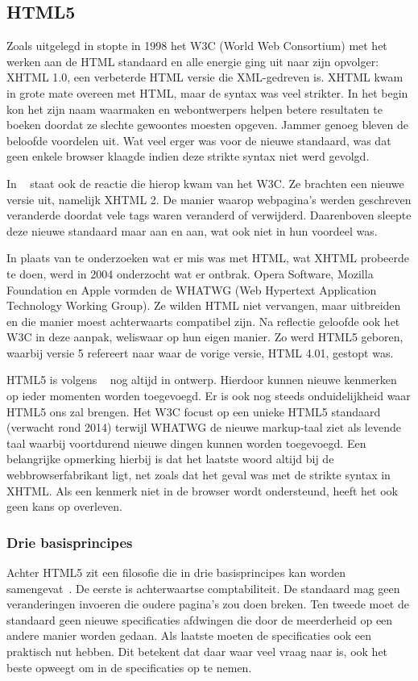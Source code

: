 \subsection{HTML5}
Zoals uitgelegd in \cite{MacDonald2011} stopte in 1998 het W3C (World Web Consortium) met het werken aan de HTML standaard en alle energie ging uit naar zijn opvolger: XHTML 1.0, een verbeterde HTML versie die XML-gedreven is. 
XHTML kwam in grote mate overeen met HTML, maar de syntax was veel strikter. 
In het begin kon het zijn naam waarmaken en webontwerpers helpen betere resultaten te boeken doordat ze slechte gewoontes moesten opgeven. 
Jammer genoeg bleven de beloofde voordelen uit. 
Wat veel erger was voor de nieuwe standaard, was dat geen enkele browser klaagde indien deze strikte syntax niet werd gevolgd.

In ~\cite{MacDonald2011} staat ook de reactie die hierop kwam van het W3C.  
Ze brachten een nieuwe versie uit, namelijk XHTML 2.
De manier waarop webpagina's werden geschreven veranderde doordat vele tags waren veranderd of verwijderd. 
Daarenboven sleepte deze nieuwe standaard maar aan en aan, wat ook niet in hun voordeel was. 

In plaats van te onderzoeken wat er mis was met HTML, wat XHTML probeerde te doen, werd in 2004 onderzocht wat er ontbrak. 
Opera Software, Mozilla Foundation en Apple vormden de WHATWG (Web Hypertext Application Technology Working Group). 
Ze wilden HTML niet vervangen, maar uitbreiden en die manier moest achterwaarts compatibel zijn. Na reflectie geloofde ook het W3C in deze aanpak, weliswaar op hun eigen manier.  
Zo werd HTML5 geboren, waarbij versie 5 refereert naar waar de vorige versie, HTML 4.01, gestopt was.

HTML5 is volgens ~\cite{MacDonald2011} nog altijd in ontwerp. 
Hierdoor kunnen nieuwe kenmerken op ieder momenten worden toegevoegd.  
Er is ook nog steeds onduidelijkheid waar HTML5 ons zal brengen.  
Het W3C focust op een unieke HTML5 standaard (verwacht rond 2014) terwijl WHATWG de nieuwe markup-taal ziet als levende taal waarbij voortdurend  nieuwe dingen kunnen worden toegevoegd. 
Een belangrijke opmerking hierbij is dat het laatste woord altijd bij de webbrowserfabrikant ligt, net zoals dat het geval was met de strikte syntax in XHTML. 
Als een kenmerk niet in de browser wordt ondersteund, heeft het ook geen kans op overleven.

\subsubsection{Drie basisprincipes}
Achter HTML5 zit een filosofie die in drie basisprincipes kan worden samengevat~\cite{MacDonald2011}.  
De eerste is achterwaartse comptabiliteit. De standaard mag geen veranderingen invoeren die oudere pagina's zou doen breken. 
Ten tweede moet de standaard geen nieuwe specificaties afdwingen die door de meerderheid op een andere manier worden gedaan. 
Als laatste moeten de specificaties ook een praktisch nut hebben. 
Dit betekent dat daar waar veel vraag naar is, ook het beste opweegt om in de specificaties op te nemen.

